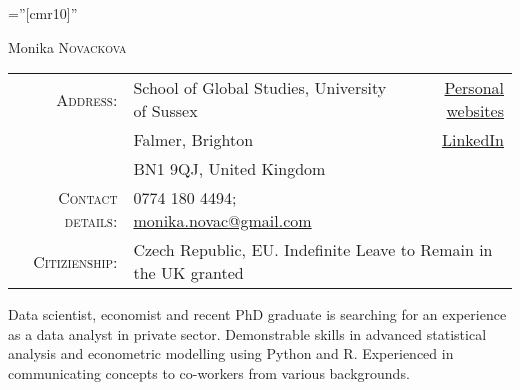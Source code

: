 \documentclass[a4paper,10pt]{article}
\begin{document}

\pagestyle{empty} %

\font\fb=''[cmr10]'' %

\par{\centering
		{\Huge Monika \textsc{Novackova}
	}\bigskip\par}


\begin{tabular}{rlr}
 
    \textsc{Address:}   & School of Global Studies, University of Sussex&  \href{https://monikanovackova.github.io/0}{Personal websites} \\
 & Falmer, Brighton&  \href{https://www.linkedin.com/in/monika-novackova/}{LinkedIn}\\
  &BN1 9QJ, United Kingdom\\
    \textsc{Contact details:}     & 0774 180 4494;\hspace{0.3cm} \href{mailto:monika.novac@gmail.com}{monika.novac@gmail.com}\\
       \textsc{Citizienship:} & \multicolumn{2}{l}{Czech Republic, EU. Indefinite Leave to Remain in the UK granted}
\end{tabular}

Data scientist, economist and recent PhD graduate is searching for an experience as a data analyst in private sector. Demonstrable skills in advanced statistical analysis and econometric modelling using Python and R. Experienced in communicating concepts to co-workers from various backgrounds.


\end{document}
